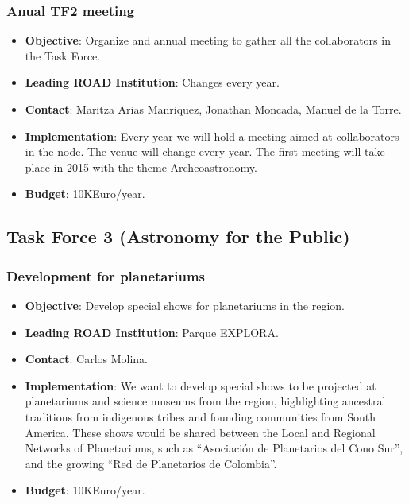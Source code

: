 \documentclass[12pt]{article}
\begin{document}
\subsubsection{Anual TF2 meeting}
\begin{itemize}
\item {\bf Objective}: 
Organize and annual meeting to gather all the
  collaborators in the Task Force.
\item {\bf Leading ROAD Institution}: Changes every year.
\item {\bf Contact}: Maritza Arias Manriquez, Jonathan Moncada, Manuel
  de la Torre.
\item {\bf Implementation}: 
Every year we will hold a meeting aimed at collaborators in the
node. The venue will change every year. The first meeting will take
place in 2015 with the theme Archeoastronomy.
\item {\bf Budget}: 10KEuro/year.
\end{itemize}




\subsection{Task Force 3 (Astronomy for the Public)}


\subsubsection{Development for planetariums}
\begin{itemize}
\item {\bf Objective}: Develop special shows for planetariums in the
  region. 
\item {\bf Leading ROAD Institution}: Parque EXPLORA.
\item {\bf Contact}: Carlos Molina.
\item {\bf Implementation}: We want to develop special shows to be projected
  at planetariums and science museums from the region, highlighting
  ancestral traditions from indigenous tribes and founding communities
  from South America. These shows would be shared between the Local
  and Regional Networks of Planetariums, such as “Asociación de
  Planetarios del Cono Sur”, and the growing “Red de Planetarios de
  Colombia”.   
\item {\bf Budget}: 10KEuro/year.
\end{itemize}
\end{document}
